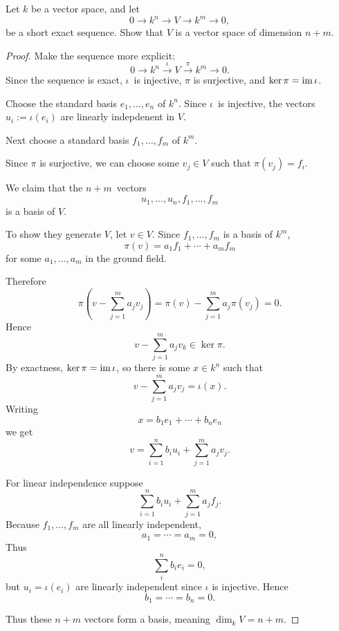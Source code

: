 \documentclass[11pt]{article}
\begin{document}
\begin{prob}
    Let $k$ be a vector space, and let 
    \[
        0 \to k^n \to V \to k^m \to 0, 
    \]
    be a short exact sequence. Show that $V$ is a vector 
    space of dimension $n+m$.
\end{prob}
\begin{proof}
    Make the sequence more explicit: 
    \[
        0 \to k^n \overset\iota\to V 
        \overset\pi\to k^m \to 0.
    \]
    Since the sequence is exact, 
    $\iota$ is injective, $\pi$ is surjective, and 
    $\ker \pi = \operatorname{im} \iota$. 

    Choose the standard basis $e_1,\ldots,e_n$ 
    of $k^n$. Since $\iota$ is injective, the 
    vectors $u_i := \iota(e_i)$ are linearly indepdenent 
    in $V$. 

    Next choose a standard basis $f_1,\ldots,f_m$ of 
    $k^m$. 

    Since $\pi$ is surjective, we can choose some $v_j \in V$ 
    such that $\pi(v_j) = f_i$. 

    We claim that the 
    $n+m$ vectors 
    \[
        u_1,\ldots,u_n,f_1,\ldots,f_m 
    \]
    is a basis of $V$. 

    To show they generate $V$, 
    let $v \in V$. Since $f_1,\ldots,f_m$ 
    is a basis of $k^m$, 
    \[
        \pi(v) = a_1f_1 + \cdots + a_mf_m
    \]
    for some $a_1,\ldots,a_m$ in the ground field. 

    Therefore 
    \[
        \pi\left(v - \sum_{j=1}^m a_jv_j\right) 
        = \pi(v) - \sum_{j=1}^m a_j\pi(v_j) = 0. 
    \]
    Hence 
    \[
        v - \sum_{j=1}^m a_jv_k \in \ker \pi. 
    \]
    By exactness, $\ker \pi = \operatorname{im} \iota$, 
    so there is some $x \in k^n$ such that 
    \[
        v - \sum_{j=1}^m a_jv_j = \iota(x). 
    \]
    Writing 
    \[
        x = b_1e_1 + \cdots + b_ne_n
    \]
    we get 
    \[
        v = \sum_{i=1}^n b_iu_i + \sum_{j=1}^m a_jv_j. 
    \]

    For linear independence suppose 
    \[
        \sum_{i=1}^n b_iu_i + 
        \sum_{j=1}^m a_jf_j. 
    \]
    Because $f_1,\ldots,f_m$ are all linearly independent, 
    \[
        a_1 = \cdots = a_m = 0, 
    \]
    Thus 
    \[
        \sum_i^n b_ie_i = 0, 
    \]
    but $u_i = \iota(e_i)$ are linearly independent 
    since $\iota$ is injective. Hence 
    \[
        b_1 = \cdots = b_n = 0. 
    \]

    Thus these $n+m$ vectors form a basis, meaning 
    $\dim_k V = n+m$.  
\end{proof}
\end{document}
